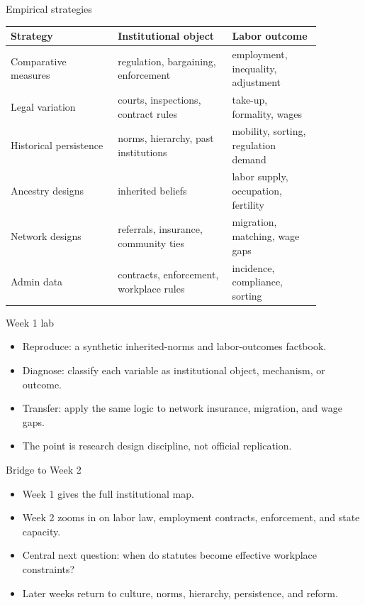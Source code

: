 \documentclass[aspectratio=169,11pt]{beamer}
\begin{document}
\begin{frame}{Empirical strategies}
\small
\begin{tabular}{p{0.30\linewidth} p{0.32\linewidth} p{0.25\linewidth}}
\toprule
Strategy & Institutional object & Labor outcome \\
\midrule
Comparative measures & regulation, bargaining, enforcement & employment, inequality, adjustment \\
Legal variation & courts, inspections, contract rules & take-up, formality, wages \\
Historical persistence & norms, hierarchy, past institutions & mobility, sorting, regulation demand \\
Ancestry designs & inherited beliefs & labor supply, occupation, fertility \\
Network designs & referrals, insurance, community ties & migration, matching, wage gaps \\
Admin data & contracts, enforcement, workplace rules & incidence, compliance, sorting \\
\bottomrule
\end{tabular}
\end{frame}

\begin{frame}{Week 1 lab}
\begin{itemize}
    \item Reproduce: a synthetic inherited-norms and labor-outcomes factbook.
    \item Diagnose: classify each variable as institutional object, mechanism, or outcome.
    \item Transfer: apply the same logic to network insurance, migration, and wage gaps.
    \item The point is research design discipline, not official replication.
\end{itemize}
\end{frame}

\begin{frame}{Bridge to Week 2}
\begin{itemize}
    \item Week 1 gives the full institutional map.
    \item Week 2 zooms in on labor law, employment contracts, enforcement, and state capacity.
    \item Central next question: when do statutes become effective workplace constraints?
    \item Later weeks return to culture, norms, hierarchy, persistence, and reform.
\end{itemize}
\end{frame}
\end{document}
